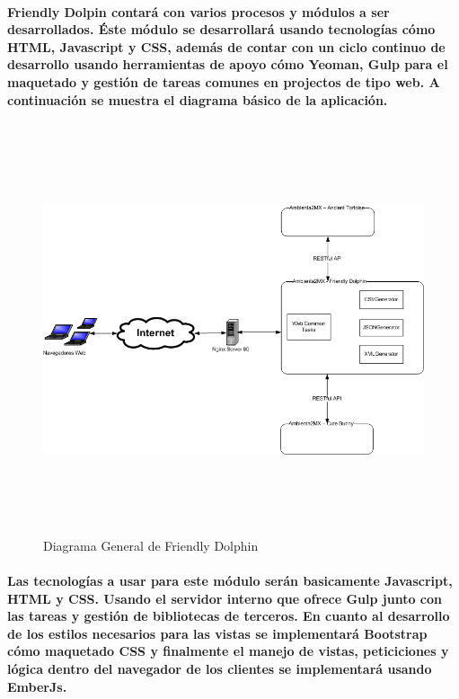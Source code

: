    \paragraph{Friendly Dolpin contará con varios procesos y módulos a ser desarrollados. Éste módulo se desarrollará usando tecnologías cómo HTML, Javascript y CSS, además de contar con un ciclo continuo de desarrollo usando herramientas de apoyo cómo Yeoman, Gulp para el maquetado y gestión de tareas comunes en projectos de tipo web. A continuación se muestra el diagrama básico de la aplicación.}
  \newpage
    \begin{landscape}
      \begin{figure}[h!]
      \centering
      \includegraphics[width=22.5cm,height=12cm]{./images/DiagramaFriendlyDolphin.png}
      \caption{Diagrama General de Friendly Dolphin}
    \end{figure}
    \end{landscape}
  \newpage
  \paragraph{Las tecnologías a usar para este módulo serán basicamente Javascript, HTML y CSS. Usando el servidor interno que ofrece Gulp junto con las tareas y gestión de bibliotecas de terceros. En cuanto al desarrollo de los estilos necesarios para las vistas se implementará Bootstrap cómo maquetado CSS y finalmente el manejo de vistas, peticiciones y lógica dentro del navegador de los clientes se implementará usando EmberJs.}
